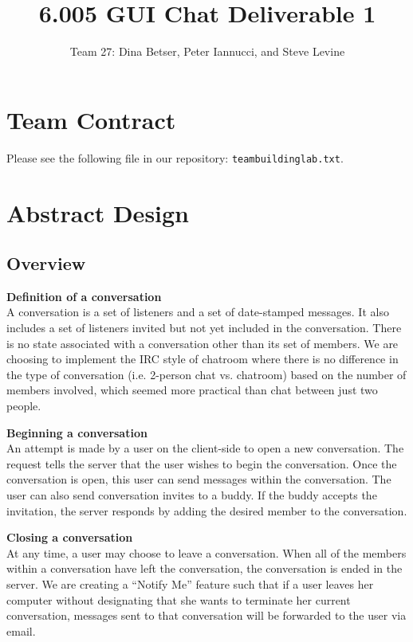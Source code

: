 \documentclass[11pt,letterpaper]{article}
\title{6.005  GUI Chat Deliverable 1}
\author{Team 27: Dina Betser, Peter Iannucci, and Steve Levine}
\begin{document}
\maketitle


\section{Team Contract}
Please see the following file in our repository: \texttt{teambuildinglab.txt}.


\section{Abstract Design}
\subsection{Overview}
\begin{center}
\end{center}

{\bf Definition of a conversation}\\
A conversation is a set of listeners and a set of date-stamped messages. It also includes a set of listeners invited but not yet included in the conversation.  There is no state associated with a conversation other than its set of members.  We are choosing to implement the IRC style of chatroom where there is no difference in the type of conversation (i.e. 2-person chat vs. chatroom) based on the number of members involved, which seemed more practical than chat between just two people. 

{\bf Beginning a conversation}\\
An attempt is made by a user on the client-side to open a new conversation.  The request tells the server that the user wishes to begin the conversation. Once the conversation is open, this user can send messages within the conversation. The user can also send conversation invites to a buddy. If the buddy accepts the invitation, the server responds by adding the desired member to the conversation. 

{\bf Closing a conversation}\\
At any time, a user may choose to leave a conversation. When all of the members within a conversation have left the conversation, the conversation is ended in the server.  We are creating a ``Notify Me'' feature such that if a user leaves her computer without designating that she wants to terminate her current
conversation, messages sent to that conversation will be forwarded to the user via email.
\end{document}
